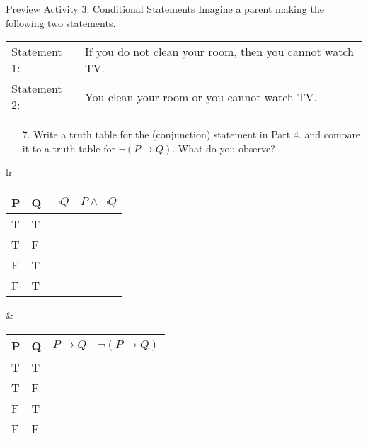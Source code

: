 \documentclass{beamer}
\begin{document}
\begin{frame}{Preview Activity 3: Conditional Statements}
	Imagine a parent making the following two statements.
	
	\begin{tabular}{lp{3 in}}
		Statement 1: & If you do not clean your room, then you cannot watch TV.\\
		Statement 2: & You clean your room or you cannot watch TV.
	\end{tabular}
	\begin{enumerate}
		\item[7.] Write a truth table for the (conjunction) statement in Part 4. and compare it
		to a truth table for $\neg(P \to Q)$.  What do you observe? \pause
	\end{enumerate}
\begin{center}
	\begin{tabular}{lr}
		\begin{tabular}{|l|l|l|l|}
			\hline
			P & Q & $\neg Q$ & $P \wedge \neg Q$\\ \hline
			T&T&& \\ \hline
			T&F&& \\ \hline
			F&T&& \\ \hline
			F&T&& \\ \hline
		\end{tabular}
		&
		\begin{tabular}{|l|l|l|l|}
			\hline
			P & Q & $P \to Q$ & $\neg ( P \to Q)$\\ \hline
			T&T&& \\ \hline
			T&F&& \\ \hline
			F&T&& \\ \hline
			F&F&& \\ \hline
		\end{tabular}
	\end{tabular}
\end{center}
\end{frame}
\end{document}
